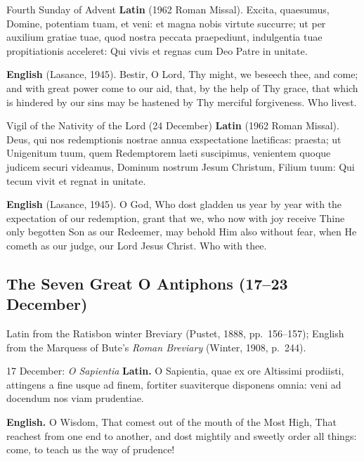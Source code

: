 \begin{massbox}{Fourth Sunday of Advent}
\textbf{Latin} (1962 Roman Missal). Excita, quaesumus, Domine, potentiam tuam,
et veni: et magna nobis virtute succurre; ut per auxilium gratiae tuae, quod
nostra peccata praepediunt, indulgentia tuae propitiationis acceleret: Qui vivis
et regnas cum Deo Patre in unitate.

\textbf{English} (Lasance, 1945). Bestir, O Lord, Thy might, we beseech thee,
and come; and with great power come to our aid, that, by the help of Thy grace,
that which is hindered by our sins may be hastened by Thy merciful forgiveness.
Who livest.
\end{massbox}

\begin{massbox}{Vigil of the Nativity of the Lord (24 December)}
\textbf{Latin} (1962 Roman Missal). Deus, qui nos redemptionis nostrae annua
exspectatione laetificas: praesta; ut Unigenitum tuum, quem Redemptorem laeti
suscipimus, venientem quoque judicem securi videamus, Dominum nostrum Jesum
Christum, Filium tuum: Qui tecum vivit et regnat in unitate.

\textbf{English} (Lasance, 1945). O God, Who dost gladden us year by year with
the expectation of our redemption, grant that we, who now with joy receive Thine
only begotten Son as our Redeemer, may behold Him also without fear, when He
cometh as our judge, our Lord Jesus Christ. Who with thee.
\end{massbox}

\subsection{The Seven Great O Antiphons (17--23 December)}

Latin from the Ratisbon winter Breviary (Pustet, 1888, pp.~156--157); English
from the Marquess of Bute's \textit{Roman Breviary} (Winter, 1908, p.~244).

\begin{massbox}{17 December: \textit{O Sapientia}}
\textbf{Latin.} O Sapientia, quae ex ore Altissimi prodiisti, attingens a fine
usque ad finem, fortiter suaviterque disponens omnia: veni ad docendum nos viam
prudentiae.

\textbf{English.} O Wisdom, That comest out of the mouth of the Most High, That
reachest from one end to another, and dost mightily and sweetly order all
things: come, to teach us the way of prudence!
\end{massbox}

